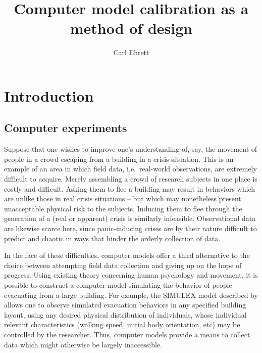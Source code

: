 \documentclass{article}
\author{Carl Ehrett}
\title{Computer model calibration as a method of design}
\begin{document}
\maketitle

\section{Introduction} \label{introduction}

\subsection{Computer experiments} \label{computer_experiments}

Suppose that one wishes to improve one's understanding of, say, the movement of people in a crowd escaping from a building in a crisis situation. This is an example of an area in which field data, i.e.\ real-world observations, are extremely difficult to acquire. Merely assembling a crowd of research subjects in one place is costly and difficult. Asking them to flee a building may result in behaviors which are unlike those in real crisis situations -- but which may nonetheless present unacceptable physical risk to the subjects. Inducing them to flee through the generation of a (real or apparent) crisis is similarly infeasible. Observational data are likewise scarce here, since panic-inducing crises are by their nature difficult to predict and chaotic in ways that hinder the orderly collection of data.

In the face of these difficulties, computer models offer a third alternative to the choice between attempting field data collection and giving up on the hope of progress. Using existing theory concerning human psychology and movement, it is possible to construct a computer model simulating the behavior of people evacuating from a large building. For example, the SIMULEX model described by \cite{Thompson1995} allows one to observe simulated evacuation behaviors in any specified building layout, using any desired physical distribution of individuals, whose individual relevant characteristics (walking speed, initial body orientation, etc) may be controlled by the researcher. Thus, computer models provide a means to collect data which might otherwise be largely inaccessible. 
\end{document}
